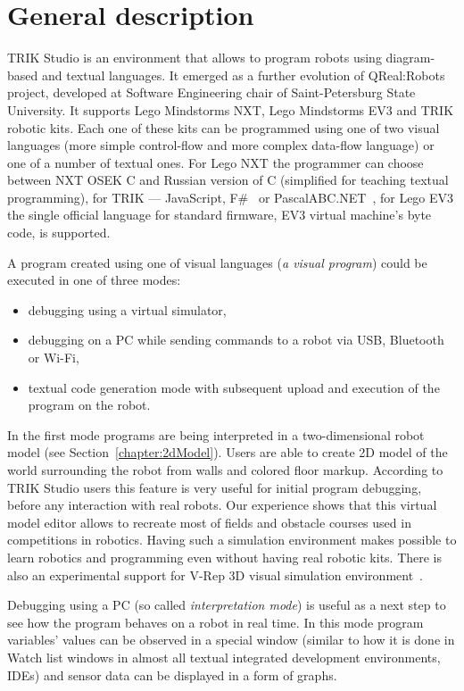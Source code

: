 \documentclass[conference]{IEEEtran}
\begin{document}
\section{General description}
\label{chapter:generalDescription}

TRIK Studio is an environment that allows to program robots using diagram-based and textual languages. It emerged as a further evolution of QReal:Robots~\cite{terekhov2013robots} project, developed at Software Engineering chair of Saint-Petersburg State University. It supports Lego Mindstorms NXT, Lego Mindstorms EV3 and TRIK robotic kits. Each one of these kits can be programmed using one of two visual languages (more simple control-flow and more complex data-flow language) or one of a number of textual ones. For Lego NXT the programmer can choose between NXT OSEK C and Russian version of C (simplified for teaching textual programming), for TRIK --- JavaScript, F\#~\cite{kirsanov2014robotics} or PascalABC.NET~\cite{doliner2014basics}, for Lego EV3 the single official language for standard firmware, EV3 virtual machine's byte code, is supported.

A program created using one of visual languages (\textit{a visual program}) could be executed in one of three modes:
\begin{itemize}
    \item debugging using a virtual simulator,
    \item debugging on a PC while sending commands to a robot via USB, Bluetooth or Wi-Fi,
    \item textual code generation mode with subsequent upload and execution of the program on the robot.
\end{itemize}

In the first mode programs are being interpreted in a two-dimensional robot model (see Section~\ref{chapter:2dModel}). Users are able to create 2D model of the world surrounding the robot from walls and colored floor markup. According to TRIK Studio users this feature is very useful for initial program debugging, before any interaction with real robots. Our experience shows that this virtual model editor allows to recreate most of fields and obstacle courses used in competitions in robotics. Having such a simulation environment makes possible to learn robotics and programming even without having real robotic kits. There is also an experimental support for V-Rep 3D visual simulation environment~\cite{rohmer2013v}.

Debugging using a PC (so called \textit{interpretation mode}) is useful as a next step to see how the program behaves on a robot in real time. In this mode program variables' values can be observed in a special window (similar to how it is done in Watch list windows in almost all textual integrated development environments, IDEs) and sensor data can be displayed in a form of graphs. 
\end{document}
